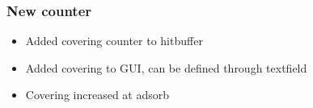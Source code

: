 \subsubsection{New counter }
\begin{itemize}[noitemsep,topsep=0pt]
\item Added covering counter to hitbuffer
\item Added covering to GUI, can be defined through textfield
\item Covering increased at adsorb
\end{itemize}

